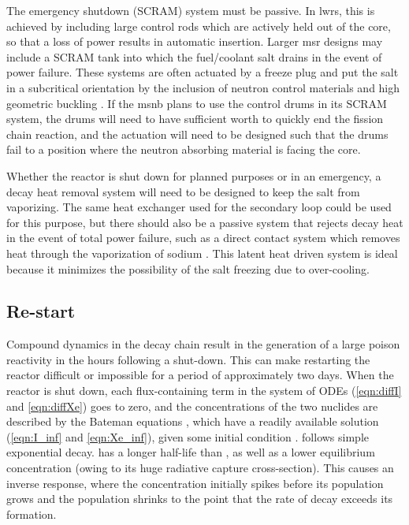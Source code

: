 The emergency shutdown (\ie SCRAM) system must be passive. In \acsp{lwr}, this is achieved by including large control rods which are actively held out of the core, so that a loss of power results in automatic insertion. Larger \acs{msr} designs may include a SCRAM tank into which the fuel/coolant salt drains in the event of power failure. These systems are often actuated by a freeze plug \cite{FreezePlug} and put the salt in a subcritical orientation by the inclusion of neutron control materials \cite{Charit} and high geometric buckling \cite{Lamarsh}. If the \acs{msnb} plans to use the control drums in its SCRAM system, the drums will need to have sufficient worth to quickly end the fission chain reaction, and the actuation will need to be designed such that the drums fail to a position where the neutron absorbing material is facing the core. 

Whether the reactor is shut down for planned purposes or in an emergency, a decay heat \cite{TodreasKazimi1} removal system will need to be designed to keep the salt from vaporizing. The same heat exchanger used for the secondary loop could be used for this purpose, but there should also be a passive system that rejects decay heat in the event of total power failure, such as a direct contact system which removes heat through the vaporization of sodium \cite{DecayHeat}. This latent heat driven system is ideal because it minimizes the possibility of the salt freezing due to over-cooling.

\subsection{Re-start}
Compound dynamics in the \Xe decay chain result in the generation of a large poison reactivity in the hours following a shut-down. This can make restarting the reactor difficult or impossible for a period of approximately two days. When the reactor is shut down, each flux-containing term in the system of ODEs (\ref{eqn:diffI} and \ref{eqn:diffXe}) goes to zero, and the concentrations of the two nuclides are described by the Bateman equations \cite{Bateman}, which have a readily available solution (\ref{eqn:I_inf} and \ref{eqn:Xe_inf}), given some initial condition \cite{Lamarsh}. \I follows simple exponential decay. \Xe has a longer half-life than \I, as well as a lower equilibrium concentration (owing to its huge radiative capture cross-section). This causes an inverse response, where the \Xe concentration initially spikes before its population grows and the \I population shrinks to the point that the rate of \Xe decay exceeds its formation. 

